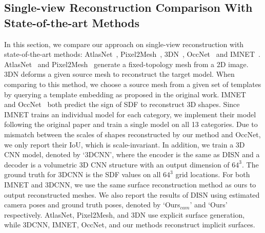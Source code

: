 \subsection{Single-view Reconstruction Comparison With State-of-the-art Methods}
\label{sec:exp:main} 
In this section, we compare our approach on single-view reconstruction with state-of-the-art methods: AtlasNet~\cite{groueix2018}, Pixel2Mesh~\cite{wang2018pixel2mesh}, 3DN~\cite{wang20193dn}, OccNet~\cite{Mescheder2019CVPR} and IMNET~\cite{chen2018learning}. AtlasNet~\cite{groueix2018} and Pixel2Mesh~\cite{wang2018pixel2mesh} generate a fixed-topology mesh from a 2D image. 3DN \cite{wang20193dn} deforms a given source mesh to reconstruct the target model. When comparing to this method, we choose a source mesh from a given set of templates by querying a template embedding as proposed in the original work. IMNET~\cite{chen2018learning} and OccNet~\cite{Mescheder2019CVPR} both predict the sign of SDF to reconstruct 3D shapes. Since IMNET trains an individual model for each category, we implement their model following the original paper and train a single model on all 13 categories. Due to mismatch between the scales of shapes reconstructed by our method and OccNet, we only report their IoU, which is scale-invariant. In addition, we train a 3D CNN model, denoted by `3DCNN', where the encoder is the same as DISN and a decoder is a volumetric 3D CNN structure with an output dimension of $64^3$. The ground truth for 3DCNN is the SDF values on all $64^3$ grid locations. For both IMNET and 3DCNN, we use the same surface reconstruction method as ours to output reconstructed meshes. We also report the results of DISN using estimated camera poses and ground truth poses, denoted by `Ours$_{cam}$' and `Ours' respectively. AtlasNet, Pixel2Mesh, and 3DN use explicit surface generation, while 3DCNN, IMNET, OccNet, and our methods reconstruct implicit surfaces. 

